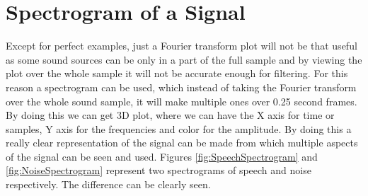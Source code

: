 \section{Spectrogram of a Signal}
Except for perfect examples, just a Fourier transform plot will not be that useful as some
sound sources can be only in a part of the full sample and by viewing the plot over the 
whole sample it will not be accurate enough for filtering. For this reason a spectrogram 
can be used, which instead of taking the Fourier transform over the whole sound sample, it 
will make multiple ones over 0.25 second frames. By doing this we can get 3D plot, where we 
can have the X axis for time or samples, Y axis for the frequencies and color for the amplitude. 
By doing this a really clear representation of the signal can be made from which multiple aspects 
of the signal can be seen and used.
Figures \ref{fig:SpeechSpectrogram} and \ref{fig:NoiseSpectrogram} represent two spectrograms
of speech and noise respectively. The difference can be clearly seen.
